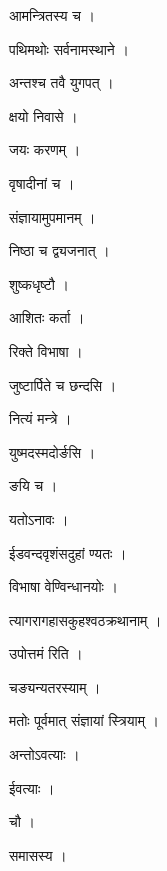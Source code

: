 \documentclass[10pt, openany]{book}
\begin{document}
\noindent आमन्त्रितस्य च ।

\noindent पथिमथोः सर्वनामस्थाने ।

\noindent अन्तश्च तवै युगपत् ।

\noindent क्षयो निवासे ।

\noindent जयः करणम् ।

\noindent वृषादीनां च ।

\noindent संज्ञायामुपमानम् ।

\noindent निष्ठा च द्व्यजनात् ।

\noindent शुष्कधृष्टौ ।

\noindent आशितः कर्ता ।

\noindent रिक्ते विभाषा ।

\noindent जुष्टार्पिते च छन्दसि ।

\noindent नित्यं मन्त्रे ।

\noindent युष्मदस्मदोर्ङसि ।

\noindent ङयि च ।

\noindent यतोऽनावः ।

\noindent ईडवन्दवृशंसदुहां ण्यतः ।

\noindent विभाषा वेण्विन्धानयोः ।

\noindent त्यागरागहासकुहश्वठक्रथानाम् ।

\noindent उपोत्तमं रिति ।

\noindent चङ्यन्यतरस्याम् ।

\noindent मतोः पूर्वमात् संज्ञायां स्त्रियाम् ।

\noindent अन्तोऽवत्याः ।

\noindent ईवत्याः ।

\noindent चौ ।

\noindent समासस्य ।
\end{document}

